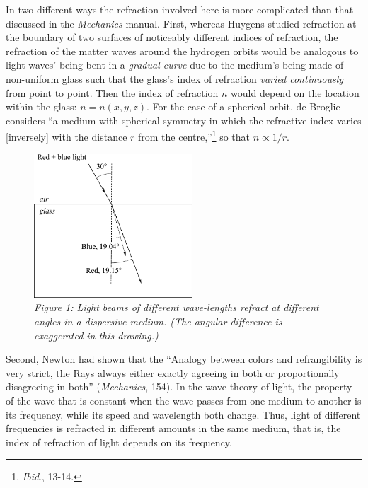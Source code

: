 In two different ways the refraction involved here is more complicated
than that discussed in the \emph{Mechanics} manual. First, whereas
Huygens studied refraction at the boundary of two surfaces of noticeably
different indices of refraction, the refraction of the matter waves
around the hydrogen orbits would be analogous to light waves' being bent
in a \emph{gradual curve} due to the medium's being made of
non-uniform glass such that the glass's index of refraction
\emph{varied continuously} from point to point. Then the index of
refraction $n$ would depend on the location within the glass:
$n = n(x,y,z)$. For the case of a spherical orbit, de
Broglie considers ``a medium with spherical symmetry in which the
refractive index varies {[}inversely{]} with the distance $r$ from
the centre,''\footnote{\emph{Ibid}., 13-14.} so that $n \propto 1/r$.

\begin{figure} %
  \begin{center}
    \includegraphics[width=2.338in,height=2.117in]{images/08_debroglie/refraction.png}
    \caption*{\emph{Figure 1: Light beams of different wave-lengths refract at different
    angles in a dispersive medium. (The angular difference is exaggerated in
    this drawing.)}}
  \end{center}
\end{figure}


Second, Newton had shown that the ``Analogy between colors and
refrangibility is very strict, the Rays always either exactly agreeing
in both or proportionally disagreeing in both'' (\emph{Mechanics}, 
154). In the wave theory of light, the property of the wave that is
constant when the wave passes from one medium to another is its
frequency, while its speed and wavelength both change. Thus, light of
different frequencies is refracted in different amounts in the same
medium, that is, the index of refraction of light depends on its
frequency.



